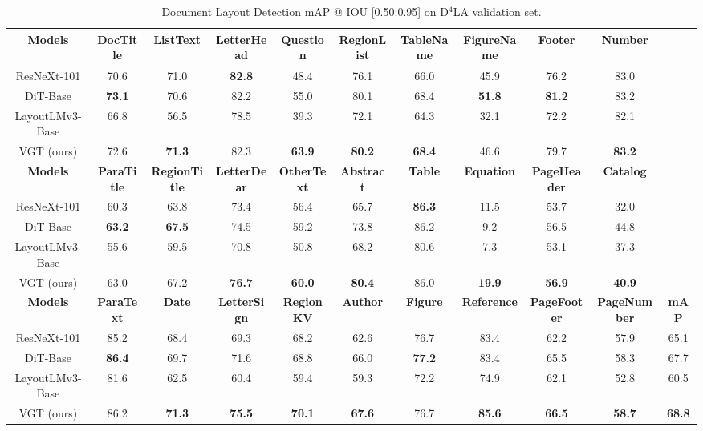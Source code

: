 \documentclass[10pt,twocolumn,letterpaper]{article}
\newcommand{\ra}[1]{\renewcommand{\arraystretch}{#1}}
\begin{document}
\begin{table*}[t]\centering
\footnotesize
\setlength{\tabcolsep}{2.5pt}
\ra{1.2}
\caption{Document Layout Detection mAP @ IOU [0.50:0.95] on D$^4$LA validation set.}
\label{tab:V12}
\begin{tabular}{|c|c|c|c|c|c|c|c|c|c|c|}
\hline
\textbf{Models}  & \textbf{DocTitle} & \textbf{ListText} & \textbf{LetterHead} & \textbf{Question} & \textbf{RegionList}  &\textbf{TableName}  &\textbf{FigureName}  &\textbf{Footer} &\textbf{Number} & \\
\hline
ResNeXt-101  &70.6  &71.0  &\textbf{82.8} &48.4  &76.1  &66.0  &45.9   &76.2  &83.0  &\\
DiT-Base &\textbf{73.1}  &70.6  &82.2 	&55.0  &80.1  &68.4  &\textbf{51.8}   &\textbf{81.2}  &83.2  & \\
LayoutLMv3-Base &66.8  &56.5  &78.5  &39.3  &72.1  &64.3  &32.1   &72.2  &82.1  &\\
VGT (ours)&72.6  &\textbf{71.3}  &82.3	&\textbf{63.9}  &\textbf{80.2}  &\textbf{68.4}  &46.6  &79.7  &\textbf{83.2}  &\\
\hline
\textbf{Models}  &\textbf{ParaTitle} & \textbf{RegionTitle} &\textbf{LetterDear}   &\textbf{OtherText}  & \textbf{Abstract} &\textbf{Table} & \textbf{Equation}  & \textbf{PageHeader}  & \textbf{Catalog} &\\
\hline
ResNeXt-101 &60.3  &63.8  &73.4  &56.4  &65.7  &\textbf{86.3}  &11.5   &53.7  &32.0 & \\
DiT-Base &\textbf{63.2}  &\textbf{67.5}  &74.5 	&59.2  &73.8  &86.2  &9.2  &56.5  &44.8 &  \\
LayoutLMv3-Base &55.6  &59.5  &70.8 &50.8  &68.2  &80.6  &7.3   &53.1  &37.3 & \\
VGT (ours) &63.0  &67.2  &\textbf{76.7} &\textbf{60.0}  &\textbf{80.4}  &86.0  &\textbf{19.9}   &\textbf{56.9}  &\textbf{40.9} & \\
\hline
\textbf{Models}  &\textbf{ParaText} & \textbf{Date} &\textbf{LetterSign}   &\textbf{RegionKV}  & \textbf{Author} &\textbf{Figure} & \textbf{Reference}  & \textbf{PageFooter}  & \textbf{PageNumber} & \textbf{mAP} \\
\hline
ResNeXt-101  &85.2  &68.4  &69.3 	&68.2  &62.6  &76.7  &83.4   &62.2  &57.9  & 65.1 \\
DiT-Base  &\textbf{86.4}  &69.7  &71.6 	&68.8  &66.0  &\textbf{77.2} &83.4  &65.5  &58.3 & 67.7\\
LayoutLMv3-Base  &81.6  &62.5  &60.4 	&59.4  &59.3  &72.2  &74.9   &62.1  &52.8  & 60.5 \\
VGT (ours) &86.2  &\textbf{71.3}  &\textbf{75.5 }	&\textbf{70.1 } &\textbf{67.6}  &76.7  &\textbf{85.6}   &\textbf{66.5}  &\textbf{58.7}  &  \textbf{68.8}  \\
\hline
\end{tabular}
\end{table*}
\end{document}
